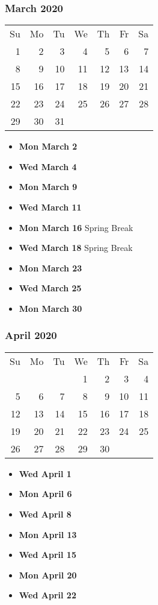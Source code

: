 \documentclass[11pt]{article}
\begin{document}
\subsubsection*{March 2020}
\begin{tabular}{rrrrrrr}
Su & Mo & Tu & We & Th & Fr & Sa\\
 1 &  2 &  3 &  4 &  5 &  6 &  7\\ 
 8 &  9 & 10 & 11 & 12 & 13 & 14\\ 
15 & 16 & 17 & 18 & 19 & 20 & 21\\ 
22 & 23 & 24 & 25 & 26 & 27 & 28\\
29 & 30 & 31 &    &    &    & \\
\end{tabular}
\begin{itemize}
\item\textbf{Mon March  2}
\item\textbf{Wed March  4}
\item\textbf{Mon March  9}
\item\textbf{Wed March 11}
\item\textbf{Mon March 16} Spring Break
\item\textbf{Wed March 18} Spring Break
\item\textbf{Mon March 23}
\item\textbf{Wed March 25}
\item\textbf{Mon March 30}
\end{itemize}

\subsubsection*{April 2020}
\begin{tabular}{rrrrrrr}
Su & Mo & Tu & We & Th & Fr & Sa\\
   &    &    &  1 &  2 &  3 &  4\\
 5 &  6 &  7 &  8 &  9 & 10 & 11\\
12 & 13 & 14 & 15 & 16 & 17 & 18\\
19 & 20 & 21 & 22 & 23 & 24 & 25\\ 
26 & 27 & 28 & 29 & 30 &    &\\ 
\end{tabular}
\begin{itemize}
\item\textbf{Wed April  1}
\item\textbf{Mon April  6}
\item\textbf{Wed April  8}
\item\textbf{Mon April 13}
\item\textbf{Wed April 15}
\item\textbf{Mon April 20}
\item\textbf{Wed April 22}
\end{itemize}
\hrulefill
\end{document}
